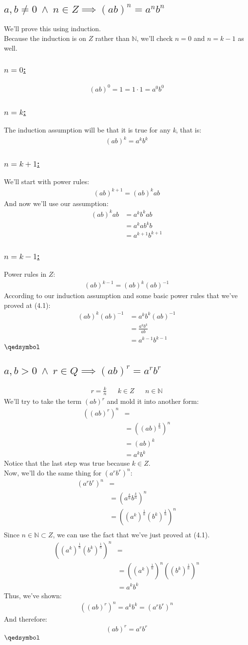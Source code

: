 \documentclass[a4paper, 12pt]{article}
\newcommand{\sub}[1]{\subsection{\underline{#1}}}
\newcommand{\subsub}[1]{\subsubsection{\underline{#1}}}
\newcommand{\N}{\ensuremath{\mathbb{N}}}
\newcommand{\eq}[1]{\begin{align*}#1\end{align*}}
\renewcommand{\qed}{\hfill\(\qedsymbol\)}
\begin{document}
\section{}
\sub{$a,b\neq{0}~\land~n\in{Z} \implies (ab)^n=a^nb^n$}
We'll prove this using induction.\\
Because the induction is on $Z$ rather than $\N$, we'll check $n=0$ and $n=k-1$ as well.
\subsub{$n=0$:}
\eq{
    (ab)^0=1=1\cdot1=a^0b^0
}
\subsub{$n=k$:}
The induction assumption will be that it is true for any \textit{k}, that is:
\eq{
    (ab)^k=a^kb^k
}
\subsub{$n=k+1$:}
We'll start with power rules:
\eq{
    (ab)^{k+1}=(ab)^kab
}
And now we'll use our assumption:
\eq{
    (ab)^kab&=a^kb^kab\\
    &=a^kab^kb\\
    &=a^{k+1}b^{k+1}
}
\subsub{$n=k-1$:}
Power rules in $Z$:
\eq{
    (ab)^{k-1}=(ab)^k(ab)^{-1}
}
According to our induction assumption and some basic power rules that we've proved at (4.1):
\eq{
    (ab)^k(ab)^{-1}&=a^kb^k(ab)^{-1}\\
    &=\frac{a^kb^k}{ab}\\
    &=a^{k-1}b^{k-1}
}
\qed
\sub{$a,b>0~\land~r\in{Q} \implies (ab)^r=a^rb^r$}
\eq{
    r=\frac{k}{n} && k\in{Z} && n\in\N
}
We'll try to take the term $(ab)^r$ and mold it into another form:
\eq{
    ((ab)^r)^n&=\\
    &=((ab)^{\frac{k}{n}})^n\\
    &=(ab)^k\\
    &=a^kb^k
}
Notice that the last step was true because $k\in{Z}$.\\
Now, we'll do the same thing for $(a^rb^r)^n$:
\eq{
    (a^rb^r)^n&=\\
    &=(a^{\frac{k}{n}}b^{\frac{k}{n}})^n\\
    &=((a^k)^\frac{1}{n}(b^k)^\frac{1}{n})^n\\
}
Since $n\in\N\subset{Z}$, we can use the fact that we've just proved at (4.1).\\
\eq{
    ((a^k)^\frac{1}{n}(b^k)^\frac{1}{n})^n&=\\
    &=((a^k)^\frac{1}{n})^n((b^k)^\frac{1}{n})^n\\
    &=a^kb^k
}
Thus, we've shown:
\eq{
    ((ab)^r)^n=a^kb^k=(a^rb^r)^n
}
And therefore:
\eq{
    (ab)^r=a^rb^r
}
\qed

\pagebreak
\setcounter{section}{5}
\end{document}
